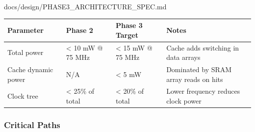 \begin{relocated}{docs/design/PHASE3_ARCHITECTURE_SPEC.md}
{
\begin{longtable}[]{@{}
  >{\raggedright\arraybackslash}p{}
  >{\raggedright\arraybackslash}p{}
  >{\raggedright\arraybackslash}p{}
  >{\raggedright\arraybackslash}p{}@{}}
\toprule\noalign{}
\begin{minipage}[b]{\linewidth}\raggedright
Parameter
\end{minipage} & \begin{minipage}[b]{\linewidth}\raggedright
Phase 2
\end{minipage} & \begin{minipage}[b]{\linewidth}\raggedright
Phase 3 Target
\end{minipage} & \begin{minipage}[b]{\linewidth}\raggedright
Notes
\end{minipage} \\
\midrule\noalign{}
\endhead
\bottomrule\noalign{}
\endlastfoot
Total power & \textless{} 10 mW @ 75 MHz & \textless{} 15 mW @ 75 MHz &
Cache adds switching in data arrays \\
Cache dynamic power & N/A & \textless{} 5 mW & Dominated by SRAM array
reads on hits \\
Clock tree & \textless{} 25\% of total & \textless{} 20\% of total &
Lower frequency reduces clock power \\
\end{longtable}
}

\subsubsection{Critical Paths}\label{ds:ch:phase3-architecture:104-critical-paths}


\end{relocated}
